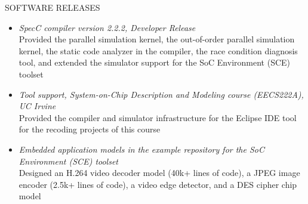 \documentclass{resume} %
\begin{document}
\begin{rSection}{SOFTWARE RELEASES}
{\small
\begin{itemize}
\item \textit{SpecC compiler version 2.2.2, Developer Release}\\
Provided the parallel simulation kernel, the out-of-order parallel simulation kernel, the static code analyzer in the compiler, the race condition diagnosis tool, and 
extended the simulator support for the SoC Environment (SCE) toolset
\vspace{-0.5em}

\item \textit{Tool support, System-on-Chip Description and Modeling course (EECS222A), UC Irvine} \\
Provided the compiler and simulator infrastructure for the Eclipse IDE tool for the recoding projects of this course
\vspace{-0.5em}

\item \textit{Embedded application models in the example repository for the SoC Environment (SCE) toolset}\\
Designed an H.264 video decoder model (40k+ lines of code), 
a JPEG image encoder (2.5k+ lines of code), 
a video edge detector, and a DES cipher chip model
\end{itemize}
}
\end{rSection}

\vspace{-0.5em}
\end{document}
